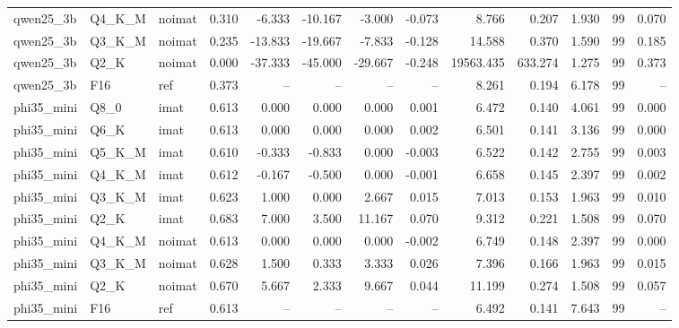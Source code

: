 \begin{tabular}{lllrrrrrrrrrr}
qwen25\_3b & Q4\_K\_M & noimat & 0.310 & -6.333 & -10.167 & -3.000 & -0.073 & 8.766 & 0.207 & 1.930 & 99 & 0.070 \\
qwen25\_3b & Q3\_K\_M & noimat & 0.235 & -13.833 & -19.667 & -7.833 & -0.128 & 14.588 & 0.370 & 1.590 & 99 & 0.185 \\
qwen25\_3b & Q2\_K & noimat & 0.000 & -37.333 & -45.000 & -29.667 & -0.248 & 19563.435 & 633.274 & 1.275 & 99 & 0.373 \\
qwen25\_3b & F16 & ref & 0.373 & -- & -- & -- & -- & 8.261 & 0.194 & 6.178 & 99 & -- \\
phi35\_mini & Q8\_0 & imat & 0.613 & 0.000 & 0.000 & 0.000 & 0.001 & 6.472 & 0.140 & 4.061 & 99 & 0.000 \\
phi35\_mini & Q6\_K & imat & 0.613 & 0.000 & 0.000 & 0.000 & 0.002 & 6.501 & 0.141 & 3.136 & 99 & 0.000 \\
phi35\_mini & Q5\_K\_M & imat & 0.610 & -0.333 & -0.833 & 0.000 & -0.003 & 6.522 & 0.142 & 2.755 & 99 & 0.003 \\
phi35\_mini & Q4\_K\_M & imat & 0.612 & -0.167 & -0.500 & 0.000 & -0.001 & 6.658 & 0.145 & 2.397 & 99 & 0.002 \\
phi35\_mini & Q3\_K\_M & imat & 0.623 & 1.000 & 0.000 & 2.667 & 0.015 & 7.013 & 0.153 & 1.963 & 99 & 0.010 \\
phi35\_mini & Q2\_K & imat & 0.683 & 7.000 & 3.500 & 11.167 & 0.070 & 9.312 & 0.221 & 1.508 & 99 & 0.070 \\
phi35\_mini & Q4\_K\_M & noimat & 0.613 & 0.000 & 0.000 & 0.000 & -0.002 & 6.749 & 0.148 & 2.397 & 99 & 0.000 \\
phi35\_mini & Q3\_K\_M & noimat & 0.628 & 1.500 & 0.333 & 3.333 & 0.026 & 7.396 & 0.166 & 1.963 & 99 & 0.015 \\
phi35\_mini & Q2\_K & noimat & 0.670 & 5.667 & 2.333 & 9.667 & 0.044 & 11.199 & 0.274 & 1.508 & 99 & 0.057 \\
phi35\_mini & F16 & ref & 0.613 & -- & -- & -- & -- & 6.492 & 0.141 & 7.643 & 99 & -- \\
\bottomrule
\end{tabular}
